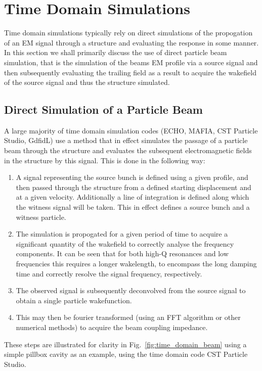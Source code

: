 \section{Time Domain Simulations}

Time domain simulations typically rely on direct simulations of the propogation of an EM signal through a structure and evaluating the response in some manner. In this section we shall primarily discuss the use of direct particle beam simulation, that is the simulation of the beams EM profile via a source signal and then subsequently evaluating the trailing field as a result to acquire the wakefield of the source signal and thus the structure simulated.

\subsection{Direct Simulation of a Particle Beam}

A large majority of time domain simulation codes (ECHO, MAFIA, CST Particle Studio, GdfidL) use a method that in effect simulates the passage of a particle beam through the structure and evaluates the subsequent electromagnetic fields in the structure by this signal. This is done in the following way:

\begin{enumerate}
\item{A signal representing the source bunch is defined using a given profile, and then passed through the structure from a defined starting displacement and at a given velocity. Additionally a line of integration is defined along which the witness signal will be taken. This in effect defines a source bunch and a witness particle.}
\item{The simulation is propogated for a given period of time to acquire a significant quantity of the wakefield to correctly analyse the frequency components. It can be seen that for both high-Q resonances and low frequencies this requires a longer wakelength, to encompass the long damping time and correctly resolve the signal frequency, respectively.}
\item{The observed signal is subsequently deconvolved from the source signal to obtain a single particle wakefunction.}
\item{This may then be fourier transformed (using an FFT algorithm or other numerical methods) to acquire the beam coupling impedance.}
\end{enumerate}

These steps are illustrated for clarity in Fig.~\ref{fig:time_domain_beam} using a simple pillbox cavity as an example, using the time domain code CST Particle Studio.

